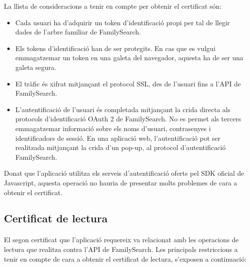     La llista de consideracions a tenir en compte per obtenir el certificat són:

    \begin{itemize}
        \item Cada usuari ha d'adquirir un token d'identificació propi per tal de llegir dades de l'arbre familiar de FamilySearch.
        \item Els tokens d'identificació han de ser protegits. En cas que es vulgui emmagatzemar un token en una galeta del navegador, aquesta ha de ser una galeta segura.
        \item El tràfic és xifrat mitjançant el protocol SSL, des de l'usuari fins a l'API de FamilySearch.
        \item L'autentificació de l'usuari és completada mitjançant la crida directa als protocols d'identificació OAuth 2 de FamilySearch. No es permet als tercers emmagatzemar informació sobre els noms d'usuari, contrasenyes i identificadors de sessió. En una aplicació web, l'autentificació pot ser realitzada mitjançant la crida d'un pop-up, al protocol d'autentificació FamilySearch.
    \end{itemize}

    Donat que l'aplicació utilitza els serveis d'autentificació oferts pel SDK oficial de Javascript, aquesta operació no hauria de presentar molts problemes de cara a obtenir el certificat.


    \subsection{Certificat de lectura}

    \paragraph{}
    El segon certificat que l'aplicació requereix va relacionat amb les operacions de lectura que realitza contra l'API de FamilySearch. Les principals restriccions a tenir en compte de cara a obtenir el certificat de lectura, s'exposen a continuació:

